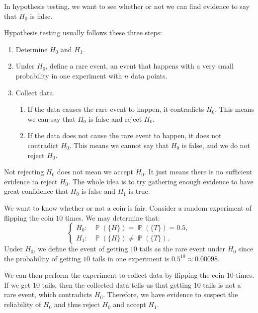 \documentclass{huhtakm-template-book-v2}
\DeclareMathOperator{\prob}{\mathbb{P}}
\begin{document}
    In hypothesis testing, we want to see whether or not we can find evidence to say that $H_{0}$ is false.
    \begin{rem}
        Hypothesis testing usually follows these three steps:
        \begin{enumerate}
            \item Determine $H_{0}$ and $H_{1}$.
            \item Under $H_{0}$, define a rare event, an event that happens with a very small probability in one experiment with $n$ data points.
            \item Collect data.
            \begin{enumerate}
                \item If the data causes the rare event to happen, it contradicts $H_{0}$. This means we can say that $H_{0}$ is false and reject $H_{0}$.
                \item If the data does not cause the rare event to happen, it does not contradict $H_{0}$. This means we cannot say that $H_{0}$ is false, and we do not reject $H_{0}$.
            \end{enumerate}
        \end{enumerate}
    \end{rem}
    \begin{rem}
        Not rejecting $H_{0}$ does not mean we accept $H_{0}$. It just means there is no sufficient evidence to reject $H_{0}$. The whole idea is to try gathering enough evidence to have great confidence that $H_{0}$ is false and $H_{1}$ is true.
    \end{rem}
    \begin{eg}
        We want to know whether or not a coin is fair. Consider a random experiment of flipping the coin $10$ times. We may determine that:
        \begin{equation*}
            \begin{cases}
                H_{0}: &\prob(\{H\})=\prob(\{T\})=0.5,\\
                H_{1}: &\prob(\{H\})\neq\prob(\{T\}).
            \end{cases}
        \end{equation*}
        Under $H_{0}$, we define the event of getting $10$ tails as the rare event under $H_{0}$ since the probability of getting $10$ tails in one experiment is $0.5^{10}\approx 0.00098$.
        
        We can then perform the experiment to collect data by flipping the coin $10$ times. If we get $10$ tails, then the collected data tells us that getting $10$ tails is not a rare event, which contradicts $H_{0}$. Therefore, we have evidence to suspect the reliability of $H_{0}$ and thus reject $H_{0}$ and accept $H_{1}$.
    \end{eg}
\end{document}
